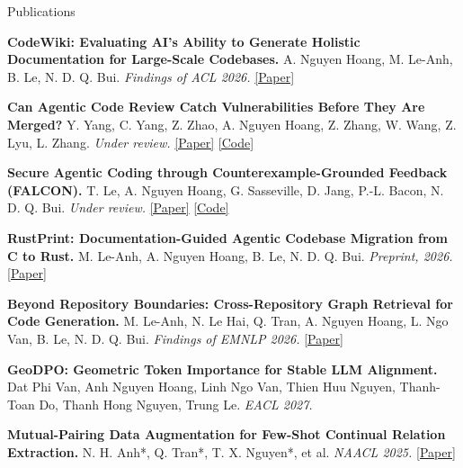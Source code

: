 \documentclass{resume} %
\begin{document}
\begin{rSection}{Publications}

\begin{enumerate}[leftmargin=1.8em,label={[\arabic*]},itemsep=0em,topsep=0.1em]

    \item \textbf{CodeWiki: Evaluating AI's Ability to Generate Holistic
    Documentation for Large-Scale Codebases.}
    A. Nguyen Hoang, M. Le-Anh, B. Le, N. D. Q. Bui.
    \textit{Findings of ACL 2026.}
    \href{https://arxiv.org/abs/2510.24428}{[Paper]}

    \item \textbf{Can Agentic Code Review Catch Vulnerabilities Before They
    Are Merged?}
    Y. Yang, C. Yang, Z. Zhao, A. Nguyen Hoang, Z. Zhang, W. Wang, Z. Lyu,
    L. Zhang.
    \textit{Under review.}
    \href{https://secprbench.github.io/paper.pdf}{[Paper]}
    \href{https://github.com/secprbench/secprbench}{[Code]}

    \item \textbf{Secure Agentic Coding through Counterexample-Grounded
    Feedback (FALCON).}
    T. Le, A. Nguyen Hoang, G. Sasseville, D. Jang, P.-L. Bacon, N. D. Q. Bui.
    \textit{Under review.}
    \href{https://arxiv.org/abs/2610.25916}{[Paper]}
    \href{https://github.com/FSoft-AI4Code/FALCON}{[Code]}

    \item \textbf{RustPrint: Documentation-Guided Agentic Codebase Migration
    from C to Rust.}
    M. Le-Anh, A. Nguyen Hoang, B. Le, N. D. Q. Bui.
    \textit{Preprint, 2026.}
    \href{https://arxiv.org/abs/2605.14634}{[Paper]}

    \item \textbf{Beyond Repository Boundaries: Cross-Repository Graph
    Retrieval for Code Generation.}
    M. Le-Anh, N. Le Hai, Q. Tran, A. Nguyen Hoang, L. Ngo Van, B. Le,
    N. D. Q. Bui.
    \textit{Findings of EMNLP 2026.}
    \href{https://arxiv.org/abs/2609.09987}{[Paper]}

    \item \textbf{GeoDPO: Geometric Token Importance for Stable LLM Alignment.}
    Dat Phi Van, Anh Nguyen Hoang, Linh Ngo Van, Thien Huu Nguyen,
    Thanh-Toan Do, Thanh Hong Nguyen, Trung Le.
    \textit{EACL 2027.}

    \item \textbf{Mutual-Pairing Data Augmentation for Few-Shot Continual
    Relation Extraction.}
    N. H. Anh*, Q. Tran*, T. X. Nguyen*, et al.
    \textit{NAACL 2025.}
    \href{https://aclanthology.org/2025.naacl-long.205/}{[Paper]}


\end{enumerate}
\end{rSection}
\end{document}
